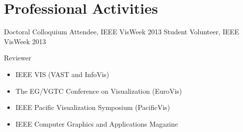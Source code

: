 \documentclass[10pt,a4paper,roman]{moderncv} %
\begin{document}



\section{Professional Activities}

\cvitem{} {Doctoral Colloquium Attendee, IEEE VisWeek 2013}
\cvitem{} {Student Volunteer, IEEE VisWeek 2013}
\cvitem{} {Reviewer
\vspace{0.1cm}
\begin{itemize}
\item IEEE VIS (VAST and InfoVis)
\item The EG/VGTC Conference on Visualization (EuroVis)
\item IEEE Pacific Visualization Symposium (PacificVis)
\item IEEE Computer Graphics and Applications Magazine
\end{itemize}
}








\clearpage
\end{document}

